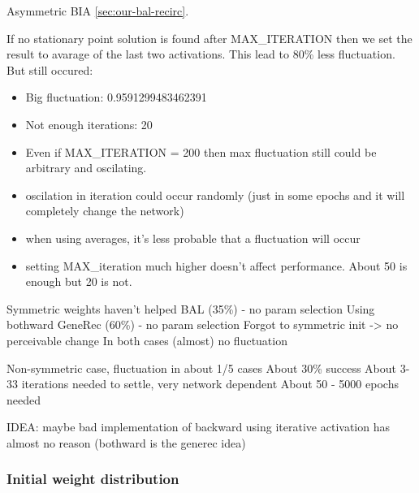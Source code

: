 Asymmetric BIA \ref{sec:our-bal-recirc}.

If no stationary point solution is found after MAX\_ITERATION then we set the result to avarage of the last two activations. This lead to 80\% less fluctuation. But still occured: 
\begin{itemize}
\item Big fluctuation: 0.9591299483462391
\item Not enough iterations: 20
\item Even if MAX\_ITERATION = 200 then max fluctuation still could be arbitrary and oscilating.
\end{itemize} 

\begin{itemize} 
  \item oscilation in iteration could occur randomly (just in some epochs and it will completely change the network) 
  \item when using averages, it's less probable that a fluctuation will occur 
  \item setting MAX\_iteration much higher doesn't affect performance. About 50 is enough but 20 is not. 
\end{itemize} 
  
Symmetric weights haven't helped BAL (35\%) - no param selection
Using bothward GeneRec (60\%) - no param selection 
  Forgot to symmetric init -> no perceivable change 
In both cases (almost) no fluctuation 

Non-symmetric case, fluctuation in about 1/5 cases 
  About 30\% success 
  About 3-33 iterations needed to settle, very network dependent 
  About 50 - 5000 epochs needed 

IDEA: maybe bad implementation of backward
      using iterative activation has almost no reason (bothward is the generec idea) 


\subsubsection{Initial weight distribution} 
\label{sec:our-sigma} 

